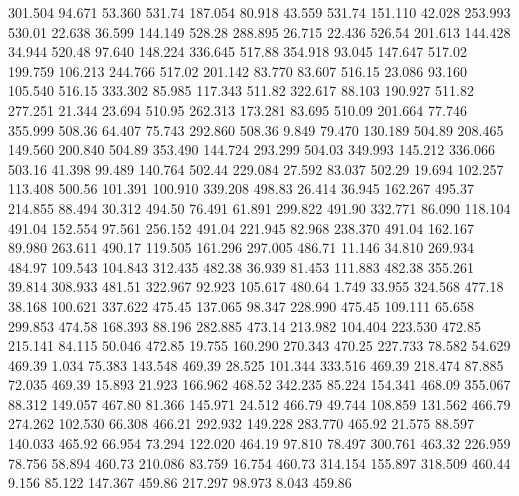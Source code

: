  301.504   94.671   53.360       531.74
 187.054   80.918   43.559       531.74
 151.110   42.028  253.993       530.01
  22.638   36.599  144.149       528.28
 288.895   26.715   22.436       526.54
 201.613  144.428   34.944       520.48
  97.640  148.224  336.645       517.88
 354.918   93.045  147.647       517.02
 199.759  106.213  244.766       517.02
 201.142   83.770   83.607       516.15
  23.086   93.160  105.540       516.15
 333.302   85.985  117.343       511.82
 322.617   88.103  190.927       511.82
 277.251   21.344   23.694       510.95
 262.313  173.281   83.695       510.09
 201.664   77.746  355.999       508.36
  64.407   75.743  292.860       508.36
   9.849   79.470  130.189       504.89
 208.465  149.560  200.840       504.89
 353.490  144.724  293.299       504.03
 349.993  145.212  336.066       503.16
  41.398   99.489  140.764       502.44
 229.084   27.592   83.037       502.29
  19.694  102.257  113.408       500.56
 101.391  100.910  339.208       498.83
  26.414   36.945  162.267       495.37
 214.855   88.494   30.312       494.50
  76.491   61.891  299.822       491.90
 332.771   86.090  118.104       491.04
 152.554   97.561  256.152       491.04
 221.945   82.968  238.370       491.04
 162.167   89.980  263.611       490.17
 119.505  161.296  297.005       486.71
  11.146   34.810  269.934       484.97
 109.543  104.843  312.435       482.38
  36.939   81.453  111.883       482.38
 355.261   39.814  308.933       481.51
 322.967   92.923  105.617       480.64
   1.749   33.955  324.568       477.18
  38.168  100.621  337.622       475.45
 137.065   98.347  228.990       475.45
 109.111   65.658  299.853       474.58
 168.393   88.196  282.885       473.14
 213.982  104.404  223.530       472.85
 215.141   84.115   50.046       472.85
  19.755  160.290  270.343       470.25
 227.733   78.582   54.629       469.39
   1.034   75.383  143.548       469.39
  28.525  101.344  333.516       469.39
 218.474   87.885   72.035       469.39
  15.893   21.923  166.962       468.52
 342.235   85.224  154.341       468.09
 355.067   88.312  149.057       467.80
  81.366  145.971   24.512       466.79
  49.744  108.859  131.562       466.79
 274.262  102.530   66.308       466.21
 292.932  149.228  283.770       465.92
  21.575   88.597  140.033       465.92
  66.954   73.294  122.020       464.19
  97.810   78.497  300.761       463.32
 226.959   78.756   58.894       460.73
 210.086   83.759   16.754       460.73
 314.154  155.897  318.509       460.44
   9.156   85.122  147.367       459.86
 217.297   98.973    8.043       459.86

